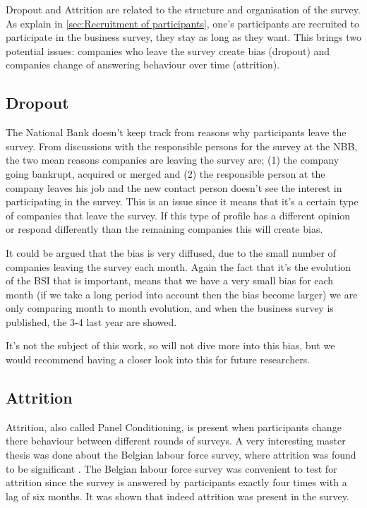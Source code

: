 \documentclass[12pt,a4paper,oneside]{book}
\begin{document}
Dropout and Attrition are related to the structure and organisation of the survey. 
As explain in \autoref{sec:Recruitment of participants}, one's participants are recruited to participate in the business survey, they stay as long as they want. This brings two potential issues: companies who leave the survey create bias (dropout) and companies change of answering behaviour over time (attrition).

\subsection{Dropout}

The National Bank doesn't keep track from reasons why participants leave the survey. From discussions with the responsible persons for the survey at the NBB, the two mean reasons companies are leaving the survey are; (1) the company going bankrupt, acquired or merged and (2) the responsible person at the company leaves his job and the new contact person doesn't see the interest in participating in the survey.
This is an issue since it means that it's a certain type of companies that leave the survey. If this type of profile has a different opinion or respond differently than the remaining companies this will create bias. 


It could be argued that the bias is very diffused, due to the small number of companies leaving the survey each month. Again the fact that it's the evolution of the BSI that is important, means that we have a very small bias for each month (if we take a long period into account then the bias become larger) we are only comparing month to month evolution, and when the business survey is published, the 3-4 last year are showed.

It's not the subject of this work, so will not dive more into this bias, but we would recommend having a closer look into this for future researchers.

\subsection{Attrition}

Attrition, also called Panel Conditioning, is present when participants change there behaviour between different rounds of surveys. 
A very interesting master thesis was done about the Belgian labour force survey, where attrition was found to be significant \cite{priyana_hardjawidjaksana_investigating_2019}.
The Belgian labour force survey was convenient to test for attrition since the survey is answered by participants exactly four times with a lag of six months.
It was shown that indeed attrition was present in the survey.
\end{document}
